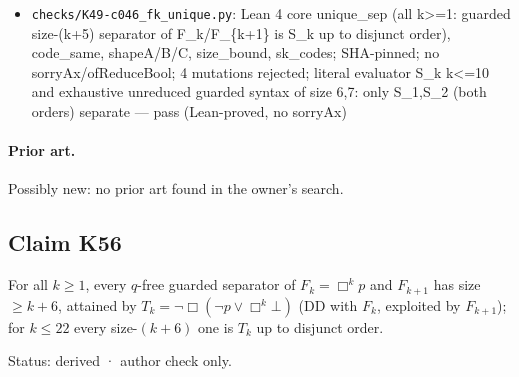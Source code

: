 \documentclass{article}
\begin{document}
\begin{itemize}
\item \texttt{checks/K49-c046\_fk\_unique.py}: Lean 4 core unique\_sep (all k\textgreater{}=1: guarded size-(k+5) separator of F\_k/F\_\{k+1\} is S\_k up to disjunct order), code\_same, shapeA/B/C, size\_bound, sk\_codes; SHA-pinned; no sorryAx/ofReduceBool; 4 mutations rejected; literal evaluator S\_k k\textless{}=10 and exhaustive unreduced guarded syntax of size 6,7: only S\_1,S\_2 (both orders) separate --- pass (Lean-proved, no sorryAx)
\end{itemize}

\paragraph{Prior art.} Possibly new: no prior art found in the owner's search.

\subsection*{Claim K56}

For all $k\ge1$, every $q$-free guarded separator of $F_k=\Box^kp$ and $F_{k+1}$ has size $\ge k+6$, attained by $T_k=\neg\Box(\neg p\lor\Box^k\bot)$ (DD with $F_k$, exploited by $F_{k+1}$); for $k\le22$ every size-$(k+6)$ one is $T_k$ up to disjunct order.

Status: derived · author check only.
\end{document}
